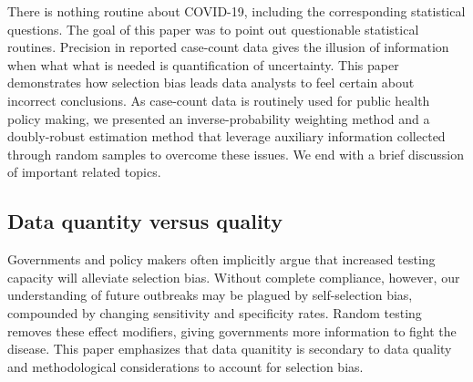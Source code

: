 \documentclass[11pt]{amsart}
\numberwithin{equation}{section}
\theoremstyle{plain}
\begin{document}
There is nothing routine about COVID-19, including the corresponding statistical questions.  The goal of this paper was to point out questionable statistical routines.  Precision in reported case-count data gives the illusion of information when what what is needed is quantification of uncertainty. This paper demonstrates how selection bias leads data analysts to feel certain about incorrect conclusions.  As case-count data is routinely used for public health policy making, we presented an inverse-probability weighting method and a doubly-robust estimation method that leverage auxiliary information collected through random samples to overcome these issues. We end with a brief discussion of important related topics.

\subsection*{Data quantity versus quality}

Governments and policy makers often implicitly argue that increased testing capacity will alleviate selection bias.  Without complete compliance, however, our understanding of future outbreaks may be plagued by self-selection bias, compounded by changing sensitivity and specificity rates. Random testing removes these effect modifiers, giving governments more information to fight the disease.  This paper emphasizes that data quanitity is secondary to data quality and methodological considerations to account for selection bias.


\end{document}
